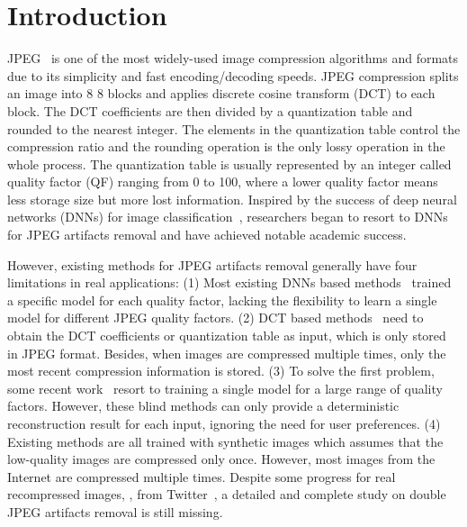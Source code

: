 \documentclass[10pt,twocolumn,letterpaper]{article}
\begin{document}
\section{Introduction}
JPEG~\cite{wallace1992jpeg} is one of the most widely-used image compression algorithms and formats due to its simplicity and fast encoding/decoding speeds. JPEG compression splits an image into 8  8 blocks and applies discrete cosine transform (DCT)
to each block. The DCT coefficients are then divided by a quantization table and rounded to the nearest integer. The elements in the quantization table control the compression ratio and the rounding operation is the only lossy operation in the whole process. The quantization table is usually represented by an integer called quality factor (QF) ranging from 0 to 100, where a lower quality factor means less storage size but more lost information. Inspired by the success of deep neural networks (DNNs) for image classification~\cite{krizhevsky2012imagenet,vgg}, researchers began to resort to DNNs for JPEG artifacts removal and have achieved notable academic success. 


However, existing methods for JPEG artifacts removal generally have four limitations in real applications: (1) Most existing DNNs based methods~\cite{cavigelli2017cas, chen2016trainable, dong2015compression, Liu_2018_CVPR_Workshops, zhang2019residual} trained a specific model for each quality factor, lacking the flexibility to learn a single model for different JPEG quality factors. (2) DCT based methods~\cite{ehrlich2020quantization, guo2016building, zhang2018dmcnn} need to obtain the DCT coefficients or quantization table as input, which is only stored in JPEG format. Besides, when images are compressed multiple times, only the most recent compression information is stored. (3) To solve the first problem, some recent work~\cite{ehrlich2020quantization, fu2019jpeg, zhang2017beyond} resort to training a single model for a large range of quality factors. However, these blind methods can only provide a deterministic reconstruction result for each input, ignoring the need for user preferences. (4) Existing methods are all trained with synthetic images which assumes that the low-quality images are compressed only once. However, most images from the Internet are compressed multiple times. Despite some progress for real recompressed images, \eg, from Twitter~\cite{dong2015compression, fu2019jpeg}, a detailed and complete study on double JPEG artifacts removal is still missing. 
\end{document}
